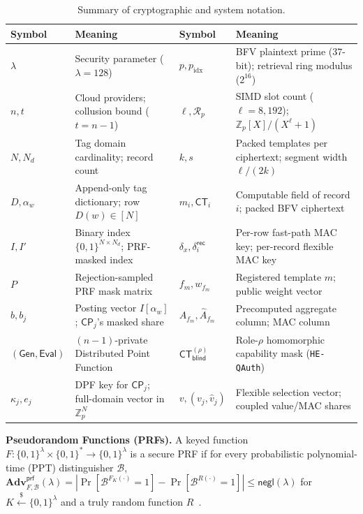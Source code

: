 \documentclass[11pt,a4paper]{article}
\begin{document}
\begin{table}[t!]
\centering
\small
\renewcommand{\arraystretch}{1.12}
\begin{tabularx}{\textwidth}{lX lX}
\toprule
\textbf{Symbol} & \textbf{Meaning} & \textbf{Symbol} & \textbf{Meaning} \\
\midrule
$\lambda$ & Security parameter ($\lambda = 128$) & $p, p_{\mathrm{idx}}$ & BFV plaintext prime ($37$-bit); retrieval ring modulus ($2^{16}$) \\
$n, t$ & Cloud providers; collusion bound ($t = n - 1$) & $\ell, \mathcal{R}_p$ & SIMD slot count ($\ell=8{,}192$); $\mathbb{Z}_p[X]/(X^\ell+1)$ \\
$N, N_d$ & Tag domain cardinality; record count & $k, s$ & Packed templates per ciphertext; segment width $\ell/(2k)$ \\
$D, \alpha_w$ & Append-only tag dictionary; row $D(w) \in [N]$ & $m_i, \mathsf{CT}_i$ & Computable field of record $i$; packed BFV ciphertext \\
$I, I'$ & Binary index $\{0,1\}^{N \times N_d}$; PRF-masked index & $\delta_x, \delta_i^{\mathsf{rec}}$ & Per-row fast-path MAC key; per-record flexible MAC key \\
$P$ & Rejection-sampled PRF mask matrix & $f_m, w_{f_m}$ & Registered template $m$; public weight vector \\
$b, b_j$ & Posting vector $I[\alpha_w]$; $\mathsf{CP}_j$'s masked share & $A_{f_m}, \widehat{A}_{f_m}$ & Precomputed aggregate column; MAC column \\
$(\mathsf{Gen}, \mathsf{Eval})$ & $(n-1)$-private Distributed Point Function & $\mathsf{CT}_{\mathsf{blind}}^{(\rho)}$ & Role-$\rho$ homomorphic capability mask (\texttt{HE-QAuth}) \\
$\kappa_j, e_j$ & DPF key for $\mathsf{CP}_j$; full-domain vector in $\mathbb{Z}_p^N$ & $v, (v_j, \hat{v}_j)$ & Flexible selection vector; coupled value/MAC shares \\
\bottomrule
\end{tabularx}
\caption{Summary of cryptographic and system notation.}
\label{tab:notation}
\end{table}

\textbf{Pseudorandom Functions (PRFs).} A keyed function $F : \{0,1\}^\lambda \times \{0,1\}^* \to \{0,1\}^\lambda$ is a secure PRF if for every probabilistic polynomial-time (PPT) distinguisher $\mathcal{B}$, $\mathbf{Adv}^{\mathsf{prf}}_{F,\mathcal{B}}(\lambda) = |\Pr[\mathcal{B}^{F_K(\cdot)} = 1] - \Pr[\mathcal{B}^{R(\cdot)} = 1]| \le \mathsf{negl}(\lambda)$ for $K \xleftarrow{\$} \{0,1\}^\lambda$ and a truly random function $R$~\cite{goldreich2019}.
\end{document}
